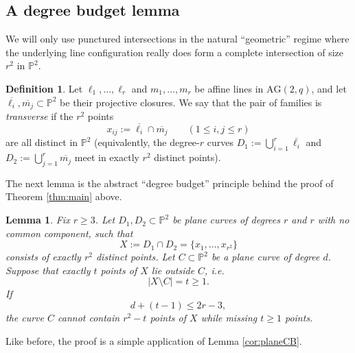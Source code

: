 \documentclass[11pt]{article}
\newtheorem{lemma}[theorem]{Lemma}
\theoremstyle{definition}
\newtheorem{definition}[theorem]{Definition}
\theoremstyle{remark}
\newcommand{\PP}{\mathbb{P}}
\newcommand{\AG}{\mathrm{AG}}
\begin{document}
\subsection{A degree budget lemma}

We will only use punctured intersections in the natural ``geometric'' regime where the underlying line configuration
really does form a complete intersection of size $r^2$ in $\PP^2$.

\begin{definition}\label{def:transverse}
Let $\ell_1,\dots,\ell_r$ and $m_1,\dots,m_r$ be affine lines in $\AG(2,q)$, and let $\overline{\ell_i},\overline{m_j}\subset\PP^2$
be their projective closures. We say that the pair of families is \emph{transverse} if the $r^2$ points
\[
x_{ij}:=\overline{\ell_i}\cap\overline{m_j}\qquad (1\le i,j\le r)
\]
are all distinct in $\PP^2$ (equivalently, the degree-$r$ curves $D_1:=\bigcup_{i=1}^r\overline{\ell_i}$ and
$D_2:=\bigcup_{j=1}^r\overline{m_j}$ meet in exactly $r^2$ distinct points).
\end{definition}

The next lemma is the abstract ``degree budget'' principle behind the proof of Theorem \ref{thm:main} above.

\begin{lemma}\label{lem:degreebudget}
Fix $r\ge 3$.
Let $D_1,D_2\subset\PP^2$ be plane curves of degrees $r$ and $r$ with no common component, such that
\[
X:=D_1\cap D_2=\{x_1,\dots,x_{r^2}\}
\]
consists of exactly $r^2$ distinct points.
Let $C\subset\PP^2$ be a plane curve of degree $d$.
Suppose that exactly $t$ points of $X$ lie outside $C$, i.e.
\[
|X\setminus C|=t\ge 1.
\]
If
\begin{equation}\label{eq:degreebudget}
d+(t-1)\le 2r-3,
\end{equation}
the curve $C$ cannot contain $r^2- t$ points of $X$ while missing $t\ge 1$ points.
\end{lemma}

Like before, the proof is a simple application of Lemma \ref{cor:planeCB}. 
\end{document}
